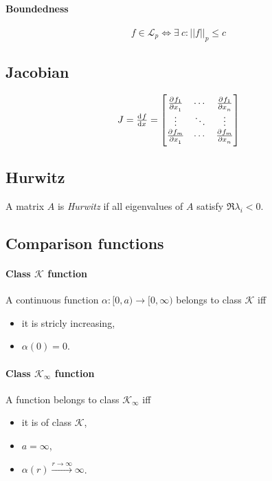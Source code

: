 \paragraph{Boundedness}
\begin{equation}
	f \in \mathcal{L}_p \Leftrightarrow \exists \: c : ||f||_p \leq c
\end{equation}

\subsection{Jacobian}
\begin{equation}
	J
	=
	\od{f}{x}
	=
	\begin{bmatrix}
		\pd{f_1}{x_1} & \cdots & \pd{f_1}{x_n} \\
		\vdots        & \ddots & \vdots        \\
		\pd{f_m}{x_1} & \cdots & \pd{f_m}{x_n}
	\end{bmatrix}
\end{equation}

\subsection{Hurwitz}
A matrix $A$ is \emph{Hurwitz} if all eigenvalues of $A$ satisfy $\Re \lambda_i < 0$.

\subsection{Comparison functions}
\paragraph{Class $\mathcal{K}$ function}
A continuous function $\alpha : [0,a) \rightarrow [0, \infty)$ belongs to class $\mathcal{K}$ iff
\begin{itemize}
	\item it is stricly increasing,
	\item $\alpha(0) = 0$.
\end{itemize}

\paragraph{Class $\mathcal{K}_\infty$ function}
A function belongs to class $\mathcal{K}_\infty$ iff
\begin{itemize}
	\item it is of class $\mathcal{K}$,
	\item $a = \infty$,
	\item $\alpha(r) \xrightarrow{r \rightarrow \infty} \infty$.
\end{itemize}


